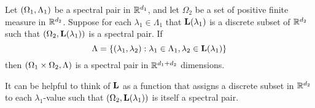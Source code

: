 \documentclass[../thesis.tex]{subfiles}
\begin{document}
\begin{theorem}\label{thrm:construction_spectra}
    Let $(\Omega_1,\Lambda_1)$ be a spectral pair in $\mathbb{R}^{d_1}$, and let $\Omega_2$ be a set of positive finite measure in $\mathbb{R}^{d_2}$. Suppose for each $\lambda_1 \in \Lambda_1$ that $\mathbf{L}(\lambda_1)$ is a discrete subset of $\mathbb{R}^{d_2}$ such that $(\Omega_2,\mathbf{L}(\lambda_1))$ is a spectral pair. If 
    \begin{equation}\label{eq:construction_spectra}
        \Lambda = \{(\lambda_1, \lambda_2): \lambda_1\in \Lambda_1, \lambda_2 \in \mathbf{L}(\lambda_1)\} 
    \end{equation}
    then $(\Omega_1\times\Omega_2, \Lambda)$ is a spectral pair in $\mathbb{R}^{d_1+d_2}$ dimensions. 
\end{theorem}

\begin{remark}
    It can be helpful to think of $\mathbf{L}$ as a function that assigns a discrete subset in $\mathbb{R}^{d_2}$ to each $\lambda_1$-value such that $(\Omega_2,\mathbf{L}(\lambda_1))$ is itself a spectral pair. %
\end{remark}
\end{document}
